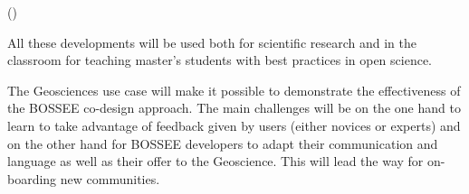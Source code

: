 \begin{task}[
  title=Geosciences application,
  id=geoscience,
  lead=UIO,
  PM=24,
  wphases={0-48},
  partners={UIO,QS,SRL}
]
\begin{compactitem}
    ()
  \end{compactitem}

  All these developments will be used both for scientific research and
  in the classroom for teaching master's students with best practices
  in open science.

  The Geosciences use case will make it possible to demonstrate the
  effectiveness of the BOSSEE co-design approach. The main challenges
  will be on the one hand to learn to take advantage of feedback given
  by users (either novices or experts) and on the other hand for
  BOSSEE developers to adapt their communication and language as well
  as their offer to the Geoscience. This will lead the way for
  on-boarding new communities.
\end{task}
